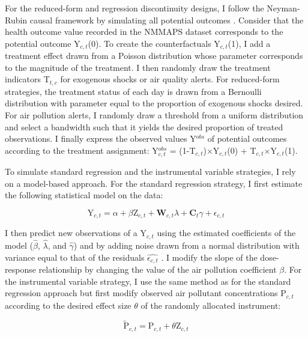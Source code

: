 \documentclass[12pt]{article}
\begin{document}
        \begin{sloppypar}
        For the reduced-form and regression discontinuity designs, I follow the Neyman-Rubin causal framework by simulating all potential outcomes \citep{rubin_estimating_1974}. Consider that the health outcome value recorded in the NMMAPS dataset corresponds to the potential outcome Y$_{c,t}$(0). To create the counterfactuals Y$_{c,t}$(1), I add a treatment effect drawn from a Poisson distribution whose parameter corresponds to the magnitude of the treatment. I then randomly draw the treatment indicators T$_{t,c}$ for exogenous shocks or air quality alerts. For reduced-form strategies, the treatment status of each day is drawn from a Bernoulli distribution with parameter equal to the proportion of exogenous shocks desired. For air pollution alerts, I randomly draw a threshold from a uniform distribution and select a bandwidth such that it yields the desired proportion of treated observations. I finally express the observed values Y$^{obs}$ of potential outcomes according to the treatment assignment: Y$^{obs}_{c,t}$ = (1-T$_{c,t}$)$\times$Y$_{c,t}$(0) + T$_{c,t}$$\times$Y$_{c,t}$(1).
        \end{sloppypar}
      
        To simulate standard regression and the instrumental variable strategies, I rely on a model-based approach. For the standard regression strategy, I first estimate the following statistical model on the data:
        
        \begin{equation}
        \text{Y}_{c,t} = \alpha + \beta\text{Z}_{c,t} + \textbf{W}_{c,t}\lambda + \textbf{C}_{t}\gamma + \epsilon_{c,t}
        \end{equation}
        
        \noindent I then predict new observations of a $\text{Y}_{c,t}$ using the estimated coefficients of the model ($\hat{\beta}$, $\hat{\lambda}$, and $\hat{\gamma}$) and by adding noise drawn from a normal distribution with variance equal to that of the residuals $\widehat{\epsilon_{c,t}}$ \citep{peng2006model}. I modify the slope of the dose-response relationship by changing the value of the air pollution coefficient $\beta$. For the instrumental variable strategy, I use the same method as for the standard regression approach but first modify observed air pollutant concentrations $\text{P}_{c,t}$ according to the desired effect size $\theta$ of the randomly allocated instrument: 
        
        \begin{equation}
        \widetilde{\text{P}}_{c,t} = \text{P}_{c,t} + \theta\text{Z}_{c,t}
        \end{equation}
        
\end{document}
